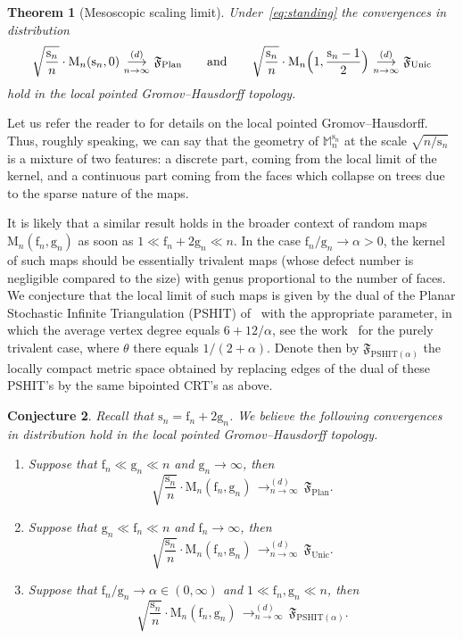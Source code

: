\documentclass[JEP,XML,SOM,Unicode,NoFloatCountersInSection,NoEqCountersInSection]{cedram}
\theoremstyle{plain}
\newtheorem{theorem}{Theorem}
\newtheorem{conjecture}[theorem]{Conjecture}
\theoremstyle{definition}
\theoremstyle{remark}
\newcommand{\Map}{\mathrm{M}}
\newcommand{\Mapb}{\mathbb{M}}
\newcommand{\face}{\mathrm{f}}
\newcommand{\gen}{\mathrm{g}}
\newcommand{\spar}{\mathrm{s}}
\newcommand{\cvloi}[1][n]{\,\mathop{\longrightarrow}^{(d)}_{#1 \to \infty}\,}
\begin{document}
\begin{theorem}[Mesoscopic scaling limit]
\label{thm:intermediate}
Under~\eqref{eq:standing} the convergences in distribution
\[
\sqrt{ \frac{\spar_{n}}{n}} \cdot \Map_{n}(\spar_{n},0) \cvloi \mathfrak{F}_{ \mathrm{Plan}}
\qquad \text{and} \qquad
\sqrt{ \frac{\spar_{n}}{n}} \cdot \Map_{n}\Bigl(1,\frac{\spar_{n}-1}{2} \Bigr) \cvloi \mathfrak{F}_{ \mathrm{Unic}}
\]
hold in the local pointed Gromov--Hausdorff topology.
\end{theorem}

Let us refer the reader to \eg \cite{BBI01,CLG14,BMR19} for details on the local pointed Gromov--Hausdorff. Thus, roughly speaking, we can say that the geometry of $ \Mapb_n^{\spar_n}$ at the scale $ \sqrt{n/\spar_n}$ is a mixture of two features: a discrete part, coming from the local limit of the kernel, and a continuous part coming from the faces which collapse on trees due to the sparse nature of the maps.

It is likely that a similar result holds in the broader context of random maps $\Map_n(\face_n, \gen_n)$ as soon as
$1 \ll \face_n+2 \gen_n \ll n$.
In the case $\face_n/\gen_n \rightarrow \alpha>0$, the kernel of such maps should be essentially trivalent maps (\ie whose defect number is negligible compared to the size) with genus proportional to the number of faces. We conjecture that the local limit of such maps is given by the dual of the Planar Stochastic Infinite Triangulation (PSHIT) of~\cite{Cur16} with the appropriate parameter, in which the average vertex degree equals $6+12/\alpha$, see the work~\cite{BL21} for the purely trivalent case, where $\theta$ there equals $1/(2+\alpha)$. Denote then by $\mathfrak{F}_{ \mathrm{PSHIT}(\alpha)}$ the locally compact metric space obtained by replacing edges of the dual of these PSHIT's by the same bipointed CRT's as above.

\begin{conjecture}\label{conjecture:general_thm}
Recall that $\spar_{n} = \face_n+2 \gen_n$.
We believe the following convergences in distribution hold in the local pointed Gromov--Hausdorff topology.
\begin{enumerate}
\item Suppose that $\face_n \ll \gen_n \ll n$ and $\gen_n \to \infty$, then
\[
\sqrt{ \frac{\spar_{n}}{n}} \cdot \Map_{n}(\face_n, \gen_n) \cvloi \mathfrak{F}_{ \mathrm{Plan}}.
\]

\item Suppose that $\gen_n \ll \face_n \ll n$ and $\face_n \to \infty$, then
\[
\sqrt{ \frac{\spar_{n}}{n}} \cdot \Map_{n}(\face_n, \gen_n) \cvloi \mathfrak{F}_{ \mathrm{Unic}}.
\]

\item Suppose that $\face_n/\gen_n \rightarrow \alpha \in (0,\infty)$ and $1 \ll \face_n,\gen_n \ll n$, then
\[
\sqrt{ \frac{\spar_{n}}{n}} \cdot \Map_{n}(\face_n, \gen_n) \cvloi \mathfrak{F}_{ \mathrm{PSHIT}(\alpha)}.
\]
\end{enumerate}
\end{conjecture}
\end{document}
